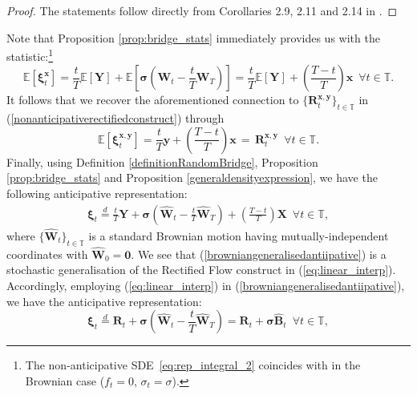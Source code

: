 \documentclass{article}
\def\E{\mathbb{E}}
\def\T{\mathbb{T}}
\theoremstyle{definition}
\begin{document}
\begin{proof}
The statements follow directly from Corollaries 2.9, 2.11 and 2.14 in \cite{goria_random-bridges_2025}.
\end{proof}
Note that Proposition \ref{prop:bridge_stats} immediately provides us with the statistic:\footnote{The non-anticipative SDE~\eqref{eq:rep_integral_2} coincides with \cite[Eq.~(4)]{shi2023diffusion} in the Brownian case ($f_t=0$, $\sigma_t=\sigma$).}
    \begin{equation}
        \E\left[\boldsymbol{\xi}^{\boldsymbol{x}}_t\right] = \frac{t}{T}\E\left[\boldsymbol{Y}\right] +  \E\left[\boldsymbol{\sigma}\left(\mathbf{W}_t - \frac{t}{T}\mathbf{W}_T \right)\right] = \frac{t}{T}\E\left[\boldsymbol{Y}\right] + \left(\frac{T-t}{T}\right)\boldsymbol{x} \,\,\, \forall t\in\T. \label{recifiedexpevtedform}
    \end{equation}
It follows that we recover the aforementioned connection to $\{\boldsymbol{R}^{\boldsymbol{x,y}}_t\}_{t\in\mathbb{T}}$ in (\ref{nonanticipativerectifiedconstruct}) through
\begin{equation}
        \E\left[\boldsymbol{\xi}^{\boldsymbol{x},\boldsymbol{y}}_t\right] = \frac{t}{T}\boldsymbol{y} + \left(\frac{T-t}{T}\right)\boldsymbol{x} \, = \, \boldsymbol{R}^{\boldsymbol{x,y}}_t \,\,\, \forall t\in\T. \label{recifiedexpevtedformnew}
    \end{equation}
Finally, using Definition \ref{definitionRandomBridge}, Proposition \ref{prop:bridge_stats} and Proposition \ref{generaldensityexpression}, we have the following anticipative representation:
\begin{align}
\label{browniangeneralisedantiipative}
\boldsymbol{\xi}_t \overset{d}{=} \frac{t}{T}\boldsymbol{Y} +  \boldsymbol{\sigma}\left(\mathbf{\hat{W}}_t - \frac{t}{T}\mathbf{\hat{W}}_T \right) +  \left(\frac{T-t}{T}\right)\boldsymbol{X} \,\,\, \forall t\in\T,
\end{align}
where $\{\mathbf{\hat{W}}_t\}_{t \in \mathbb{T}}$ is a standard Brownian motion having mutually-independent coordinates with $\mathbf{\hat{W}}_0 = \boldsymbol{0}$. We see that (\ref{browniangeneralisedantiipative}) is a stochastic generalisation of the Rectified Flow construct in (\ref{eq:linear_interp}). Accordingly, employing (\ref{eq:linear_interp}) in (\ref{browniangeneralisedantiipative}), we have the anticipative representation:
\begin{equation}
    \boldsymbol{\xi}_t \overset{d}{=} \boldsymbol{R}_t +  \boldsymbol{\sigma}\left(\mathbf{\hat{W}}_t - \frac{t}{T}\mathbf{\hat{W}}_T \right) = \boldsymbol{R}_t +  \boldsymbol{\sigma}\mathbf{\hat{B}}_{t}\,\,\, \forall t\in\T, \label{brownianrectifiedcomb}
\end{equation}
\end{document}
